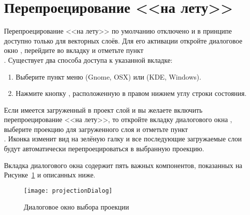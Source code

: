 \section{Перепроецирование <<на лету>>}\label{label_projstart}

Перепроецирование <<на лету>> по умолчанию отключено и в принципе доступно
только для векторных слоёв. Для его активации откройте диалоговое окно
, перейдите во вкладку
 и отметьте пункт \\
. Существует два
способа доступа к указанной вкладке:

\begin{enumerate}
\item Выберите пункт  меню
 (Gnome, OSX) или  (KDE,
Windows).
\item Нажмите кнопку , расположенную в правом нижнем углу строки состояния.
\end{enumerate}

Если имеется загруженный в проект слой и вы желаете включить перепроецирование
<<на лету>>, то откройте вкладку  диалогового окна
, выберите проекцию для загруженного слоя и
отметьте пункт \\
. Иконка
 изменит вид
на зелёную галку и все последующие загружаемые слои будут автоматически
перепроецироваться в выбранную проекцию.

Вкладка  диалогового окна 
содержит пять важных компонентов, показанных на Рисунке~\ref{fig:projections} и
описанных ниже.

\begin{figure}[ht]
   \centering
   \texttt{[image: projectionDialog]}
   \caption{Диалоговое окно выбора проекции \nixcaption}\label{fig:projections}
\end{figure}

